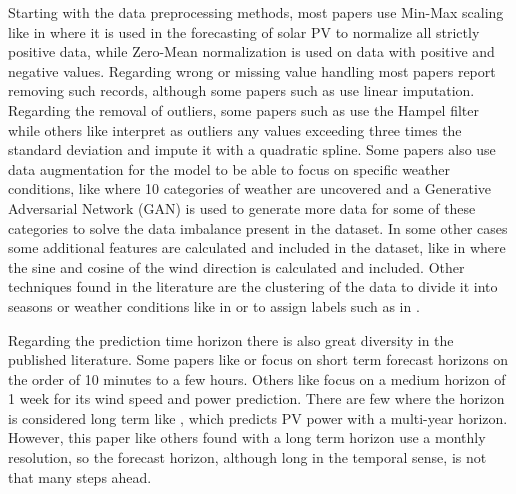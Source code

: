 Starting with the data preprocessing methods, most papers use Min-Max scaling like in \cite{ju_sun_chen_zhang_zhu_rehman_2019} where it is used in the forecasting of solar PV to normalize all strictly positive data, while Zero-Mean normalization is used on data with positive and negative values. Regarding wrong or missing value handling most papers report removing such records, although some papers such as \cite{peng_peng_fu_lu_tang_wang_li_2020} use linear imputation. Regarding the removal of outliers, some papers such as \cite{sharadga_hajimirza_balog_2020} use the Hampel filter while others like \cite{zang_cheng_ding_cheung_wang_wei_sun_2020} interpret as outliers any values exceeding three times the standard deviation and impute it with a quadratic spline.  
Some papers also use data augmentation for the model to be able to focus on specific weather conditions, like \cite{wang_zhang_liu_yu_pang_nevenshafie2018} where 10 categories of weather are uncovered and a Generative Adversarial Network (GAN) is used to generate more data for some of these categories to solve the data imbalance present in the dataset. In some other cases some additional features are calculated and included in the dataset, like in \cite{yin_ou_huang_meng_2019} where the sine and cosine of the wind direction is calculated and included.
Other techniques found in the literature are the clustering of the data to divide it into seasons or weather conditions like in \cite{alzahrani_shamsi_cihan_ferdowsi_2017} or to assign labels such as in \cite{wang_xuan_zhen_li_wang_shi_2020}.

Regarding the prediction time horizon there is also great diversity in the published literature. Some papers like \cite {hu_zhang_zhou_2015} or \cite{chen_zhu_li_zhu_shi_li_duan_liu_2019} focus on short term forecast horizons on the order of 10 minutes to a few hours.  Others like \cite{aly_2020} focus on a medium horizon of 1 week for its wind speed and power prediction. There are few where the horizon is considered long term like \cite{ray_shah_islam_islam_2020}, which predicts PV power with a multi-year horizon. However, this paper like others found with a long term horizon use a monthly resolution, so the forecast horizon, although long in the temporal sense, is not that many steps ahead. 

